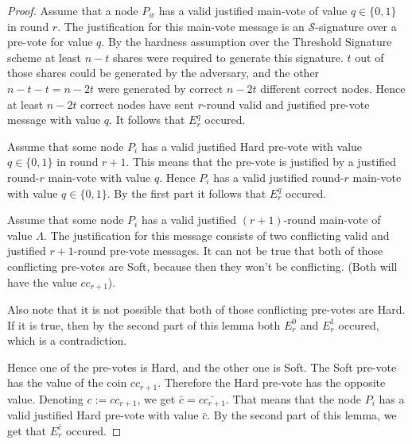 \begin{proof}
  Assume that a node $P_w$ has a valid justified main-vote of value
  $q \in \{0,1\}$ in round $r$. The justification for this main-vote message is
  an $\mathcal{S}$-signature over a pre-vote for value $q$. By the hardness
  assumption over the Threshold Signature scheme at least $n-t$ shares were
  required to generate this signature. $t$ out of those shares could be
  generated by the adversary, and the other $n-t-t = n-2t$ were generated by
  correct $n-2t$ different correct nodes. Hence at least $n-2t$ correct nodes
  have sent $r$-round valid and justified pre-vote message with value $q$. It
  follows that $E_r^q$ occured.

  Assume that some node $P_i$ has a valid justified Hard pre-vote
  with value $q \in \{0,1\}$ in round $r+1$. This means that the pre-vote is
  justified by a justified round-$r$ main-vote with value $q$. Hence $P_i$ has a
  valid justified round-$r$ main-vote with value $q \in \{0,1\}$. By the first
  part it follows that $E_r^q$ occured.



  Assume that some node $P_i$ has a valid justified $(r+1)$-round main-vote of
  value $\Lambda$. The justification for this message consists of two
  conflicting valid and justified $r+1$-round pre-vote messages. It can not be
  true that both of those conflicting pre-votes are Soft, because then they
  won't be conflicting. (Both will have the value ${cc}_{r+1}$). 

  Also note that it is not possible that both of those conflicting pre-votes are
  Hard. If it is true, then by the second part of this lemma both $E_r^0$ and
  $E_r^1$ occured, which is a contradiction. 

  Hence one of the pre-votes is Hard, and the other one is Soft. The Soft
  pre-vote has the value of the coin ${cc}_{r+1}$. Therefore the Hard pre-vote
  has the opposite value. Denoting $c := {cc}_{r+1}$, we get $\bar{c} =
  \bar{{cc}_{r+1}}$. That means that the node $P_i$ has a valid justified Hard
  pre-vote with value $\bar{c}$. By the second part of this lemma, we get that
  $E_r^{\bar{c}}$ occured.
\end{proof}

